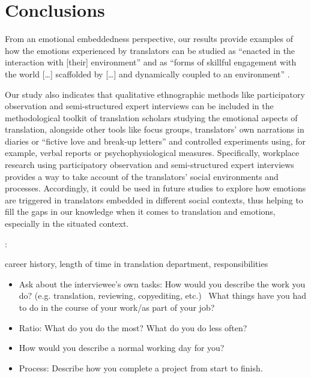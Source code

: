 \documentclass[output=paper]{langscibook}
\begin{document}
\section{Conclusions}
From an emotional embeddedness perspective, our results provide examples of how the emotions experienced by translators can be studied as “enacted in the interaction with [their] environment” \citep[285]{Wilutzky2011} and as “forms of skillful engagement with the world […] scaffolded by […] and dynamically coupled to an environment” \citep[438]{Griffiths2009}.

Our study also indicates that qualitative ethnographic methods like participatory observation and semi-structured expert interviews can be included in the methodological toolkit of translation scholars studying the emotional aspects of translation, alongside other tools like focus groups, translators’ own narrations in diaries or ``fictive love and break-up letters'' \citep{Ruokonen2017} and controlled experiments using, for example, verbal reports or psychophysiological measures. Specifically, workplace research using participatory observation and semi-structured expert interviews provides a way to take account of the translators’ social environments and processes. Accordingly, it could be used in future studies to explore how emotions are triggered in translators embedded in different social contexts, thus helping to fill the gaps in our knowledge when it comes to translation and emotions, especially in the situated context.


: \label{sec:10:appendix}

 career history, length of time in translation department, responsibilities


\begin{itemize}
\itemsep0em
    \item Ask about the interviewee’s own tasks: How would you describe the work you do? (e.g. translation, reviewing, copyediting, etc.) \rightarrow ~What things have you had to do in the course of your work/as part of your job?
    \item Ratio: What do you do the most? What do you do less often?
    \item How would you describe a normal working day for you?
    \item Process: Describe how you complete a project from start to finish.
\end{itemize}
\end{document}
